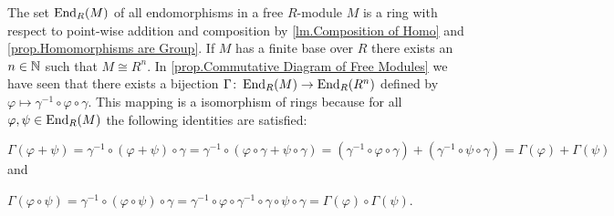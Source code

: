 \begin{rem}
The set $\operatorname{\mathrm{End}}_R(M)$ of all endomorphisms in a free $R$-module $M$ is a ring with respect to point-wise addition and composition  by \cref{lm.Composition of Homo} and \cref{prop.Homomorphisms are Group}. If $M$ has a finite base over $R$ there exists an $n\in\operatorname{\mathbb{N}}$ such that $M\cong R^n$. In \cref{prop.Commutative Diagram of Free Modules} we have seen that there exists a bijection $\Gamma\colon\operatorname{\mathrm{End}}_R(M)\to\operatorname{\mathrm{End}}_R(R^n)$ defined by $\varphi\mapsto\gamma^{-1}\circ\varphi\circ\gamma$. This mapping is a isomorphism of rings because for all $\varphi,\psi\in\operatorname{\mathrm{End}}_R(M)$ the following identities are satisfied:
\begin{exlist}
\item $\Gamma(\varphi+\psi)=\gamma^{-1}\circ(\varphi+\psi)\circ\gamma =\gamma^{-1}\circ(\varphi\circ\gamma+\psi\circ\gamma)= (\gamma^{-1}\circ\varphi\circ\gamma)+(\gamma^{-1}\circ\psi\circ\gamma)=\Gamma(\varphi)+\Gamma(\psi)$ and
\item $\Gamma(\varphi\circ\psi)=\gamma^{-1}\circ(\varphi\circ\psi)\circ\gamma =\gamma^{-1}\circ\varphi\circ\gamma^{-1}\circ\gamma\circ\psi\circ\gamma =\Gamma(\varphi)\circ\Gamma(\psi)$.
\end{exlist}
\end{rem}

